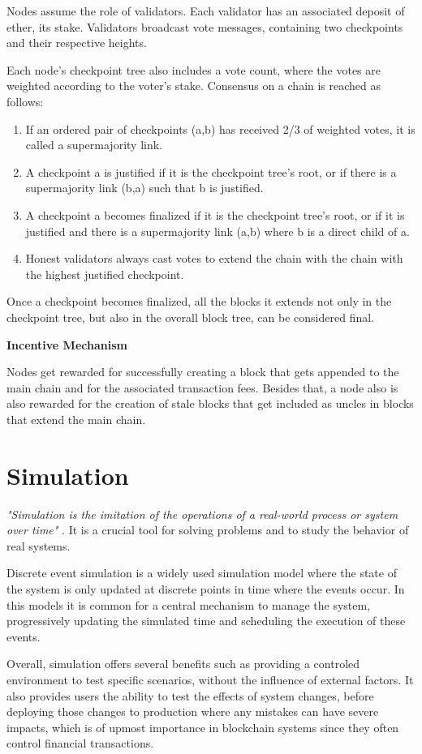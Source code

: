 Nodes assume the role of validators. Each validator has an associated deposit of ether, its stake. Validators broadcast vote messages, containing two checkpoints and their respective heights.

Each node’s checkpoint tree also includes a vote count, where the votes are weighted according to the voter’s stake. Consensus on a chain is reached as follows:

\begin{enumerate}
  \item If an ordered pair of checkpoints (a,b) has received 2/3 of weighted votes, it is called a supermajority link.
  \item A checkpoint a is justified if it is the checkpoint tree’s root, or if there is a supermajority link (b,a) such that b is justified.
  \item A checkpoint a becomes finalized if it is the checkpoint tree’s root, or if it is justified and there is a supermajority link (a,b) where b is a direct child of a.
  \item Honest validators always cast votes to extend the chain with the chain with the highest justified checkpoint.
\end{enumerate}

Once a checkpoint becomes finalized, all the blocks it extends not only in the checkpoint tree, but also in the overall block tree, can be considered final.

\vspace{0.25cm}

\textbf{Incentive Mechanism}

Nodes get rewarded for successfully creating a block that gets appended to the main chain and for the associated transaction fees. Besides that, a node also is also rewarded for the creation of stale blocks that get included as uncles in blocks that extend the main chain.




\section{Simulation}

\textit{"Simulation is the imitation of the operations of a real-world process or system over time"} \cite{intro_simulation}. It is a crucial tool for solving problems and to study the behavior of real systems.

Discrete event simulation is a widely used simulation model where the state of the system is only updated at discrete points in time where the events occur. In this models it is common for a central mechanism to manage the system, progressively updating the simulated time and scheduling the execution of these events.

Overall, simulation offers several benefits \cite{intro_simulation} such as providing a controled environment to test specific scenarios, without the influence of external factors. It also provides users the ability to test the effects of system changes, before deploying those changes to production where any mistakes can have severe impacts, which is of upmost importance in blockchain systems since they often control financial transactions.